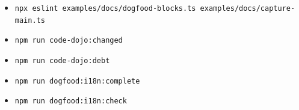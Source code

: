 \begin{itemize}
\tightlist
\item
  \texttt{n\allowbreak{}p\allowbreak{}x\allowbreak{} \allowbreak{}e\allowbreak{}s\allowbreak{}l\allowbreak{}i\allowbreak{}n\allowbreak{}t\allowbreak{} \allowbreak{}e\allowbreak{}x\allowbreak{}a\allowbreak{}m\allowbreak{}p\allowbreak{}l\allowbreak{}e\allowbreak{}s\allowbreak{}/\allowbreak{}d\allowbreak{}o\allowbreak{}c\allowbreak{}s\allowbreak{}/\allowbreak{}d\allowbreak{}o\allowbreak{}g\allowbreak{}f\allowbreak{}o\allowbreak{}o\allowbreak{}d\allowbreak{}-\allowbreak{}b\allowbreak{}l\allowbreak{}o\allowbreak{}c\allowbreak{}k\allowbreak{}s\allowbreak{}.\allowbreak{}t\allowbreak{}s\allowbreak{} \allowbreak{}e\allowbreak{}x\allowbreak{}a\allowbreak{}m\allowbreak{}p\allowbreak{}l\allowbreak{}e\allowbreak{}s\allowbreak{}/\allowbreak{}d\allowbreak{}o\allowbreak{}c\allowbreak{}s\allowbreak{}/\allowbreak{}c\allowbreak{}a\allowbreak{}p\allowbreak{}t\allowbreak{}u\allowbreak{}r\allowbreak{}e\allowbreak{}-\allowbreak{}m\allowbreak{}a\allowbreak{}i\allowbreak{}n\allowbreak{}.\allowbreak{}t\allowbreak{}s}
\item
  \texttt{n\allowbreak{}p\allowbreak{}m\allowbreak{} \allowbreak{}r\allowbreak{}u\allowbreak{}n\allowbreak{} \allowbreak{}c\allowbreak{}o\allowbreak{}d\allowbreak{}e\allowbreak{}-\allowbreak{}d\allowbreak{}o\allowbreak{}j\allowbreak{}o\allowbreak{}:\allowbreak{}c\allowbreak{}h\allowbreak{}a\allowbreak{}n\allowbreak{}g\allowbreak{}e\allowbreak{}d}
\item
  \texttt{n\allowbreak{}p\allowbreak{}m\allowbreak{} \allowbreak{}r\allowbreak{}u\allowbreak{}n\allowbreak{} \allowbreak{}c\allowbreak{}o\allowbreak{}d\allowbreak{}e\allowbreak{}-\allowbreak{}d\allowbreak{}o\allowbreak{}j\allowbreak{}o\allowbreak{}:\allowbreak{}d\allowbreak{}e\allowbreak{}b\allowbreak{}t}
\item
  \texttt{n\allowbreak{}p\allowbreak{}m\allowbreak{} \allowbreak{}r\allowbreak{}u\allowbreak{}n\allowbreak{} \allowbreak{}d\allowbreak{}o\allowbreak{}g\allowbreak{}f\allowbreak{}o\allowbreak{}o\allowbreak{}d\allowbreak{}:\allowbreak{}i\allowbreak{}1\allowbreak{}8\allowbreak{}n\allowbreak{}:\allowbreak{}c\allowbreak{}o\allowbreak{}m\allowbreak{}p\allowbreak{}l\allowbreak{}e\allowbreak{}t\allowbreak{}e}
\item
  \texttt{n\allowbreak{}p\allowbreak{}m\allowbreak{} \allowbreak{}r\allowbreak{}u\allowbreak{}n\allowbreak{} \allowbreak{}d\allowbreak{}o\allowbreak{}g\allowbreak{}f\allowbreak{}o\allowbreak{}o\allowbreak{}d\allowbreak{}:\allowbreak{}i\allowbreak{}1\allowbreak{}8\allowbreak{}n\allowbreak{}:\allowbreak{}c\allowbreak{}h\allowbreak{}e\allowbreak{}c\allowbreak{}k}

\end{itemize}
